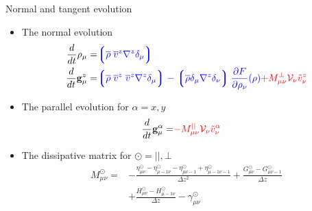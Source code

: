 \documentclass{beamer}
\newcommand{\llg}{\left\lgroup}
\newcommand{\rlg}{\right\rgroup}
\begin{document}
\begin{frame}{Normal and tangent evolution}
\begin{itemize}
  \item The normal evolution 
\begin{align}
  \frac{d}{dt}\rho_\mu=&  {\color{blue} \llg\overline{\rho} \; \overline{v}^{z}{\nabla}^{z}\delta_\mu \rlg}
\nonumber\\
    \frac{d}{dt}{{\bf g}}^{z}_\mu=&
{\color{blue} \llg\overline{\rho}\; \overline{v}^{z}\;\overline{v}^{z}{\nabla}^{z}\delta_{\mu}\rlg
-\llg\overline{\rho}\delta_{\mu}{\nabla}^{z}\delta_{\nu}\rlg
\frac{\partial  F}{\partial \rho_{\nu}}(\rho)}
{\color{red} +M_{\mu\nu}^{\bot}{\cal V}_\nu\tilde{v}^{z}_\nu}
\nonumber
\end{align}
  \item The parallel evolution for $\alpha=x,y$  
\begin{align}
  \frac{d}{dt}{{\bf g}}^\alpha_\mu=&{\color{red}-M_{\mu\nu}^{||}{\cal V}_\nu\tilde{v}^\alpha_\nu}
\nonumber
\end{align}
\item The dissipative matrix for $\odot=||,\bot$
\begin{align}
M^{\odot}_{\mu\nu} 
=&-\frac{\eta^{\odot}_{\mu\nu}-\eta^{\odot}_{\mu-1\nu}-\eta^{\odot}_{\mu\nu-1}+\eta^{\odot}_{\mu-1\nu-1}}{\Delta z^2}
+\frac{{G}^{\odot}_{\mu\nu}-{G}^{\odot}_{\mu\nu-1}}{\Delta z} \nonumber \\
&+\frac{{H}^{\odot}_{\mu\nu}-{H}^{\odot}_{\mu-1\nu}}{\Delta z}
-{\gamma}^{\odot}_{\mu\nu}
\nonumber
\end{align}
\end{itemize}
\end{frame}
\end{document}
